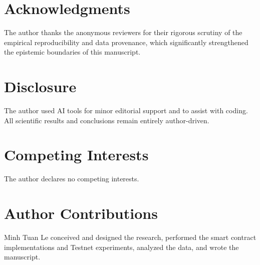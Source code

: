 \documentclass[fleqn,10pt,lineno]{wlpeerj}
\begin{document}
\section*{Acknowledgments}

The author thanks the anonymous reviewers for their rigorous scrutiny of the empirical reproducibility and data provenance, which significantly strengthened the epistemic boundaries of this manuscript.

\section*{Disclosure}

The author used AI tools for minor editorial support and to assist with coding. All scientific results and conclusions remain entirely author-driven.

\section*{Competing Interests}
The author declares no competing interests.

\section*{Author Contributions}
Minh Tuan Le conceived and designed the research, performed the smart contract implementations and Testnet experiments, analyzed the data, and wrote the manuscript.


\end{document}
